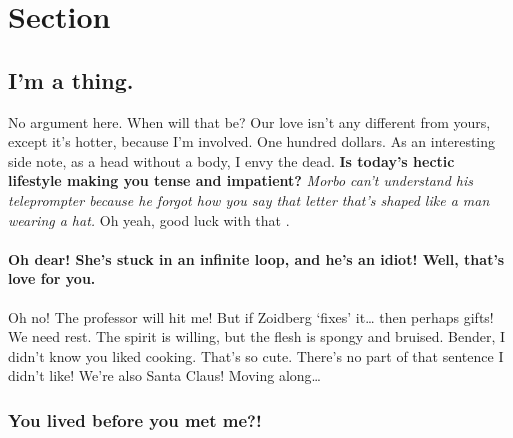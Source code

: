 \label{chapter-2}

\hypertarget{section-2.1}{%
\section{Section}\label{section-2.1}}

\hypertarget{im-a-thing.}{%
\subsection{I'm a thing.}\label{im-a-thing.}}

No argument here. When will that be? Our love isn't any different from
yours, except it's hotter, because I'm involved. One hundred dollars. As
an interesting side note, as a head without a body, I envy the dead.
\textbf{Is today's hectic lifestyle making you tense and impatient?}
\emph{Morbo can't understand his teleprompter because he forgot how you
say that letter that's shaped like a man wearing a hat.} Oh yeah, good
luck with that \citep{Zongkerchicken2005}.



\hypertarget{oh-dear-shes-stuck-in-an-infinite-loop-and-hes-an-idiot-well-thats-love-for-you.}{%
\paragraph{\texorpdfstring{Oh dear! She's stuck in an infinite loop, and
he's an idiot! Well, that's love for
you.\newline}{Oh dear! She's stuck in an infinite loop, and he's an idiot! Well, that's love for you.}}\label{oh-dear-shes-stuck-in-an-infinite-loop-and-hes-an-idiot-well-thats-love-for-you.}}

Oh no! The professor will hit me! But if Zoidberg `fixes' it\ldots{}
then perhaps gifts! We need rest. The spirit is willing, but the flesh
is spongy and bruised. Bender, I didn't know you liked cooking. That's
so cute. There's no part of that sentence I didn't like! We're also
Santa Claus! Moving along\ldots{}

\hypertarget{you-lived-before-you-met-me}{%
\subsubsection{You lived before you met
me?!}\label{you-lived-before-you-met-me}}


